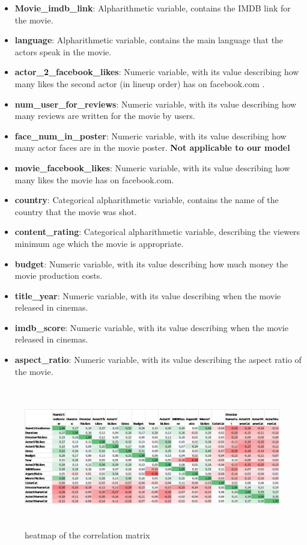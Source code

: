 \documentclass[letterpaper,twocolumn,10pt]{article}
\begin{document}
\begin{itemize}
\item \textbf{Movie\_imdb\_link}: Alpharithmetic variable, contains the IMDB link for the movie. 
\item \textbf{language}: Alpharithmetic variable, contains the main language that the actors speak in the movie.
\item \textbf{actor\_2\_facebook\_likes}: Numeric variable, with its value describing how many likes the second actor (in lineup order) has on facebook.com . 
\item \textbf{num\_user\_for\_reviews}: Numeric variable, with its value describing how many reviews are written for the movie by users.
\item \textbf{face\_num\_in\_poster}: Numeric variable, with its value describing how many actor faces are in the movie poster. \textbf{Not applicable to our model}
\item \textbf{movie\_facebook\_likes}: Numeric variable, with its value describing how many likes the movie has on facebook.com.
\item \textbf{country}: Categorical alpharithmetic variable, contains the name of the country that the movie was shot.
\item \textbf{content\_rating}:  Categorical alpharithmetic variable, describing the viewers minimum age which the movie is appropriate.
\item \textbf{budget}: Numeric variable, with its value describing how much money the movie production costs.
\item \textbf{title\_year}: Numeric variable, with its value describing when the movie released in cinemas.
\item \textbf{imdb\_score}: Numeric variable, with its value describing when the movie released in cinemas.
\item \textbf{aspect\_ratio}: Numeric variable, with its value describing the aspect ratio of the movie.
\end{itemize}

\begin{figure}
	
	\includegraphics[width = \textwidth,height=6.2cm]{correlation_matrix_image}
	\caption{heatmap of the correlation matrix}
\end{figure}
\end{document}
